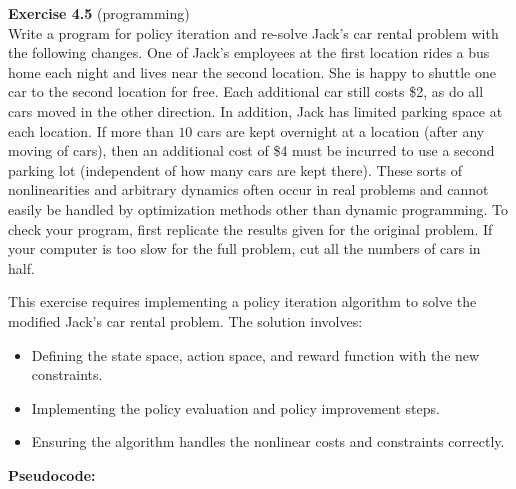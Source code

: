 \documentclass[addpoints]{exam}
\begin{document}
\begin{questions}
    \question
    \textbf{Exercise 4.5} (programming) \\ Write a program for policy iteration and re-solve Jack's car rental problem with the following changes. One of Jack's employees at the first location rides a bus home each night and lives near the second location. She is happy to shuttle one car to the second location for free. Each additional car still costs \$2, as do all cars moved in the other direction. In addition, Jack has limited parking space at each location. If more than \(10\) cars are kept overnight at a location (after any moving of cars), then an additional cost of \$4 must be incurred to use a second parking lot (independent of how many cars are kept there). These sorts of nonlinearities and arbitrary dynamics often occur in real problems and cannot easily be handled by optimization methods other than dynamic programming. To check your program, first replicate the results given for the original problem. If your computer is too slow for the full problem, cut all the numbers of cars in half.
    \begin{solution}
        This exercise requires implementing a policy iteration algorithm to solve the modified Jack's car rental problem. The solution involves:
        \begin{itemize}
            \item Defining the state space, action space, and reward function with the new constraints.
            \item Implementing the policy evaluation and policy improvement steps.
            \item Ensuring the algorithm handles the nonlinear costs and constraints correctly.
        \end{itemize}

        \textbf{Pseudocode:}


\end{solution}
\end{questions}
\end{document}
